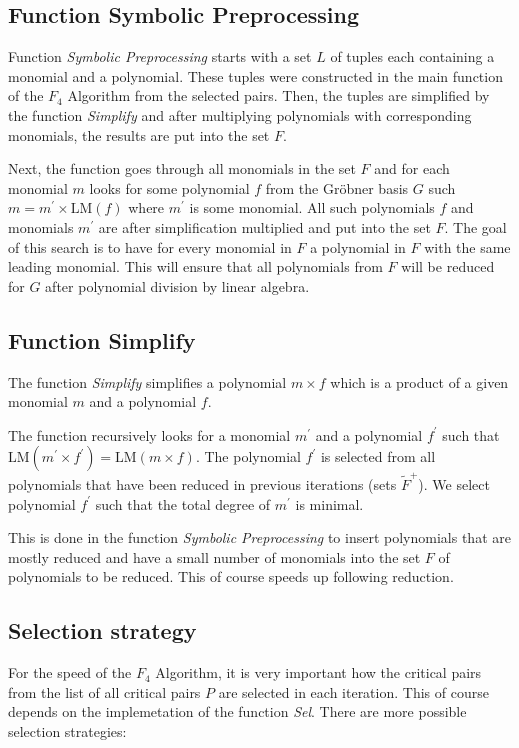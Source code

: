 

\subsection{Function Symbolic Preprocessing}
Function \textit{Symbolic Preprocessing} starts with a set $L$ of tuples each containing a monomial and a polynomial. These tuples were constructed in the main function of the $F_4$ Algorithm from the selected pairs. Then, the tuples are simplified by the function \textit{Simplify} and after multiplying polynomials with corresponding monomials, the results are put into the set $F$.

Next, the function goes through all monomials in the set $F$ and for each monomial $m$ looks for some polynomial $f$ from the Gr\"obner basis $G$ such $m = m^\prime \times \textrm{LM}(f)$ where $m^\prime$ is some monomial. All such polynomials $f$ and monomials $m^\prime$ are after simplification multiplied and put into the set $F$. The goal of this search is to have for every monomial in $F$ a polynomial in $F$ with the same leading monomial. This will ensure that all polynomials from $F$ will be reduced for $G$ after polynomial division by linear algebra.



\subsection{Function Simplify}
The function \textit{Simplify} simplifies a polynomial $m \times f$ which is a product of a given monomial $m$ and a polynomial $f$.

The function recursively looks for a monomial $m^\prime$ and a polynomial $f^\prime$ such that $\textrm{LM}(m^\prime\times f^\prime) = \textrm{LM}(m\times f)$. The polynomial $f^\prime$ is selected from all polynomials that have been reduced in previous iterations (sets $\tilde{F}^+$). We select polynomial $f^\prime$ such that the total degree of $m^\prime$ is minimal.

This is done in the function \textit{Symbolic Preprocessing} to insert polynomials that are mostly reduced and have a small number of monomials into the set $F$ of polynomials to be reduced. This of course speeds up following reduction.



\subsection{Selection strategy}
\label{subsec:F4:sel}
For the speed of the $F_4$ Algorithm, it is very important how the critical pairs from the list of all critical pairs $P$ are selected in each iteration. This of course depends on the implemetation of the function \textit{Sel}. There are more possible selection strategies:

